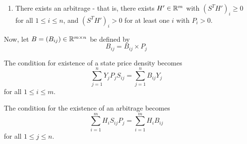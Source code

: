 \begin{enumerate}
\begin{enumerate}
  \item There exists an arbitrage - that is, there exists $H' \in \mathbb{R}^{m}$ with 
    $(S^{T} H')_{i} \geq 0$ for all $1 \leq i \leq n$, and $(S^{T} H')_{i} > 0$ for
    at least one $i$ with $P_{i} > 0$.
  \end{enumerate}

  Now, let $B = (B_{ij}) \in \mathbb{R}^{m \times n}$ be defined by
  \begin{equation}
    \label{eq:8}
    B_{ij} = B_{ij} \times P_{j}
  \end{equation}

  The condition for existence of a state price density becomes
  \begin{equation}
    \label{eq:10}
    \sum_{j=1}^{n} Y_{j} P_{j} S_{ij} = \sum_{j=1}^{n} B_{ij} Y_{j}
  \end{equation}  for all $1 \leq i \leq m$.

  The condition for the existence of an arbitrage becomes
  \begin{equation}
    \label{eq:11}
    \sum_{i=1}^{m} H_{i} S_{ij} P_{j} = \sum_{i=1}^{m} H_{i} B_{ij}
  \end{equation} for all $1 \leq j \leq n$.


\end{enumerate}
